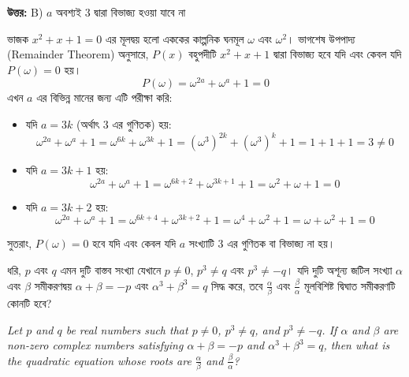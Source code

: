 \documentclass[12pt, a4paper]{article}
\begin{document}
\vspace{0.5em}
\begin{tcolorbox}[answerbox]
    \textbf{\color{success} উত্তর:} B) $a$ অবশ্যই $3$ দ্বারা বিভাজ্য হওয়া যাবে না
\end{tcolorbox}
\vspace{1em}

\begin{tcolorbox}[solutionbox={সমাধান (Solution)}]
    \noindent
    ভাজক $x^2 + x + 1 = 0$ এর মূলদ্বয় হলো এককের কাল্পনিক ঘনমূল $\omega$ এবং $\omega^2$। ভাগশেষ উপপাদ্য (Remainder Theorem) অনুসারে, $P(x)$ বহুপদীটি $x^2+x+1$ দ্বারা বিভাজ্য হবে যদি এবং কেবল যদি $P(\omega) = 0$ হয়।
    \[ P(\omega) = \omega^{2a} + \omega^a + 1 = 0 \]
    এখন $a$ এর বিভিন্ন মানের জন্য এটি পরীক্ষা করি:
    
    \vspace{0.5em}
    \begin{itemize}
        \item যদি $a = 3k$ (অর্থাৎ $3$ এর গুণিতক) হয়:
        \[ \omega^{2a} + \omega^a + 1 = \omega^{6k} + \omega^{3k} + 1 = (\omega^3)^{2k} + (\omega^3)^k + 1 = 1 + 1 + 1 = 3 \neq 0 \]
        \item যদি $a = 3k + 1$ হয়:
        \[ \omega^{2a} + \omega^a + 1 = \omega^{6k+2} + \omega^{3k+1} + 1 = \omega^2 + \omega + 1 = 0 \]
        \item যদি $a = 3k + 2$ হয়:
        \[ \omega^{2a} + \omega^a + 1 = \omega^{6k+4} + \omega^{3k+2} + 1 = \omega^4 + \omega^2 + 1 = \omega + \omega^2 + 1 = 0 \]
    \end{itemize}
    
    \vspace{0.5em}
    সুতরাং, $P(\omega) = 0$ হবে যদি এবং কেবল যদি $a$ সংখ্যাটি $3$ এর গুণিতক বা বিভাজ্য না হয়।
\end{tcolorbox}
\begin{tcolorbox}[questionbox={প্রশ্ন (Question) 38}]
    \noindent
    ধরি, $p$ এবং $q$ এমন দুটি বাস্তব সংখ্যা যেখানে $p \ne 0$, $p^3 \ne q$ এবং $p^3 \ne -q$। যদি দুটি অশূন্য জটিল সংখ্যা $\alpha$ এবং $\beta$ সমীকরণদ্বয় $\alpha+\beta = -p$ এবং $\alpha^3+\beta^3 = q$ সিদ্ধ করে, তবে $\frac{\alpha}{\beta}$ এবং $\frac{\beta}{\alpha}$ মূলবিশিষ্ট দ্বিঘাত সমীকরণটি কোনটি হবে?
    
    \vspace{0.8em}
    \begin{english}
    \noindent\textit{\color{darkgray}
    Let $p$ and $q$ be real numbers such that $p \ne 0$, $p^3 \ne q$, and $p^3 \ne -q$. If $\alpha$ and $\beta$ are non-zero complex numbers satisfying $\alpha+\beta = -p$ and $\alpha^3+\beta^3 = q$, then what is the quadratic equation whose roots are $\frac{\alpha}{\beta}$ and $\frac{\beta}{\alpha}$?
    }
    \end{english}
\end{tcolorbox}
\end{document}
